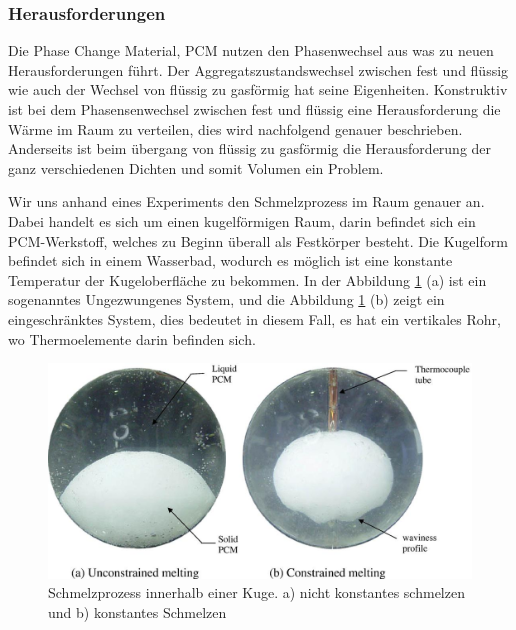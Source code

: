 \documentclass[11pt,a4paper]{scrartcl}
\begin{document}
\subsubsection{Herausforderungen}

Die Phase Change Material, PCM nutzen den Phasenwechsel aus was zu neuen Herausforderungen führt. Der Aggregatszustandswechsel zwischen fest und flüssig wie auch der Wechsel von flüssig zu gasförmig hat seine Eigenheiten. Konstruktiv ist bei dem Phasensenwechsel zwischen fest und flüssig eine Herausforderung die Wärme im Raum zu verteilen, dies wird nachfolgend genauer beschrieben. Anderseits ist beim übergang von flüssig zu gasförmig die Herausforderung der ganz verschiedenen Dichten und somit Volumen ein Problem.

Wir uns anhand eines Experiments den Schmelzprozess im Raum genauer an. Dabei handelt es sich um einen kugelförmigen Raum, darin befindet sich ein PCM-Werkstoff, welches zu Beginn überall als Festkörper besteht. Die Kugelform befindet sich in einem Wasserbad, wodurch es möglich ist eine konstante Temperatur der Kugeloberfläche zu bekommen. In der Abbildung \ref{fig:meltingpaper} (a) ist ein sogenanntes Ungezwungenes System, und die Abbildung \ref{fig:meltingpaper} (b) zeigt ein eingeschränktes System, dies bedeutet in diesem Fall, es hat ein vertikales Rohr, wo Thermoelemente darin befinden sich.

\begin{figure}[h!]
\begin{center}
\includegraphics[scale=0.4]{images/Meltinginsidesphere.jpg}
\caption{Schmelzprozess innerhalb einer Kuge. a) nicht konstantes schmelzen und b) konstantes Schmelzen \cite{WasteEnergyHarvesting}}
\label{fig:meltingpaper}
\end{center}
\end{figure}
\end{document}
